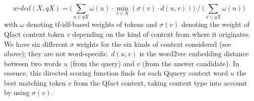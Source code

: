 \vspace{0.1cm}
$$\textit{w-ded}(X,qX) = \Bigg( \sum\limits_{u \in qX} 
\omega(u) \cdot \min\limits_{v \in X}
(\sigma(v) \cdot d(u,v))
\Bigg)
~/~
\Bigg( \sum\limits_{u \in qX} \omega(u) \Bigg)$$
with $\omega$ denoting tf-idf-based weights of tokens
and $\sigma(v)$ denoting the weight of Qfact context
token $v$ depending on the kind of context from where
it originates. We have six different $\sigma$
weights for the six kinds of context considered (see above); they are not word-specific.
$d(u,v)$ is the word2vec embedding distance between
two words $u$ (from the query) and $v$ (from the answer candidate). In essence, this directed scoring function finds for each Qquery context word $u$ the best matching token $v$ from the Qfact context, taking context type into account by using $\sigma(v)$.


\begin{comment}

Context agreement \textit{w-ded} is then combined with quantity similarity and entity prominence to produce Qfact relevance score:
\[
\textit{rel-score}(\mathcal{F}) = \alpha \cdot \textit{w-ded}(X,qX) + \beta \cdot \textit{sim}(q,qq)
+ \gamma \cdot \textit{prom}(e)
\]
where $\textit{sim}(q,qq)$ is measured using relative numeric distance, entity prominence $\textit{prom}(e)$ is computed from Wikipedia page-view, and $\alpha$, $\beta$, $\gamma$ are hyper-parameters. Prior work \cite{DBLP:conf/semweb/HoIPBW19} treats quantity condition $qq$ merely as a filter. We extend this by additionally taking quantity similarity into account, which boosts Qfacts, whose quantity $q$ has the same order of magnitude as the query quantity $qq$. 
For example, when searching for stadiums with a capacity above 50,000, we expect
all answers to be somewhere between 50,000 and say 200,000, but values in the millions would be suspicious (e.g., when confusing the annual ticket sales with capacity).
Optionally, we consider also entity prominence to ensures that important entities are prioritized to show to the user.
\end{comment}

